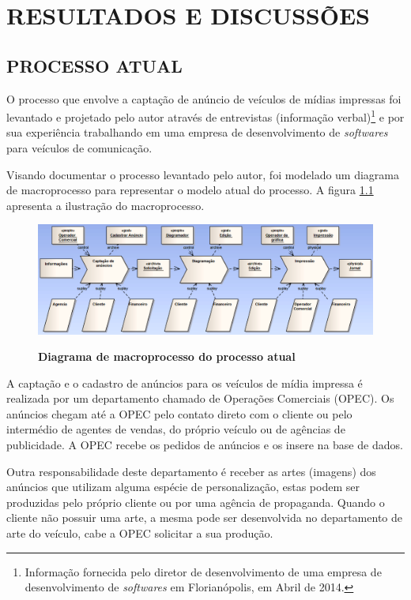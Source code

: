 \documentclass[
	12pt,				%
	openright,			%
	oneside,			%
	a4paper,			%
	chapter=TITLE,		%
	section=TITLE,		%
	english,			%
	french,				%
	spanish,			%
	brazil				%
	]{abntex2}
\begin{document}
\chapter{RESULTADOS E DISCUSSÕES}


\section{PROCESSO ATUAL}
O processo que envolve a captação de anúncio de veículos de mídias impressas foi levantado e projetado pelo autor através de entrevistas (informação verbal)\footnote{Informação fornecida pelo diretor de desenvolvimento de uma empresa de desenvolvimento de \textit{softwares} em Florianópolis, em Abril de 2014.} e por sua experiência trabalhando em uma empresa de desenvolvimento de \textit{softwares} para veículos de comunicação.

Visando documentar o processo levantado pelo autor, foi modelado um diagrama de macroprocesso para representar o modelo atual do processo. A figura \ref{fig-diag-macroprocesso} apresenta a ilustração do macroprocesso.

\begin{figure}[h]
	\begin{center}
		\caption{
			\textbf{Diagrama de macroprocesso do processo atual}
		}\label{fig-diag-macroprocesso}
		\includegraphics [scale=0.58]{imagens/diagrama_macro_processo.png}
		\label{fig-diag-macroprocesso}
	\end{center}
\end{figure}


A captação e o cadastro de anúncios para os veículos de mídia impressa é realizada por um departamento chamado de Operações Comerciais (OPEC). Os anúncios chegam até a OPEC pelo contato direto com o cliente ou pelo intermédio de agentes de vendas, do próprio veículo ou de agências de publicidade. A OPEC recebe os pedidos de anúncios e os insere na base de dados.

Outra responsabilidade deste departamento é receber as artes (imagens) dos anúncios que utilizam alguma espécie de personalização, estas podem ser produzidas pelo próprio cliente ou por uma agência de propaganda. Quando o cliente não possuir uma arte, a mesma pode ser desenvolvida no departamento de arte do veículo, cabe a OPEC solicitar a sua produção.
\end{document}
